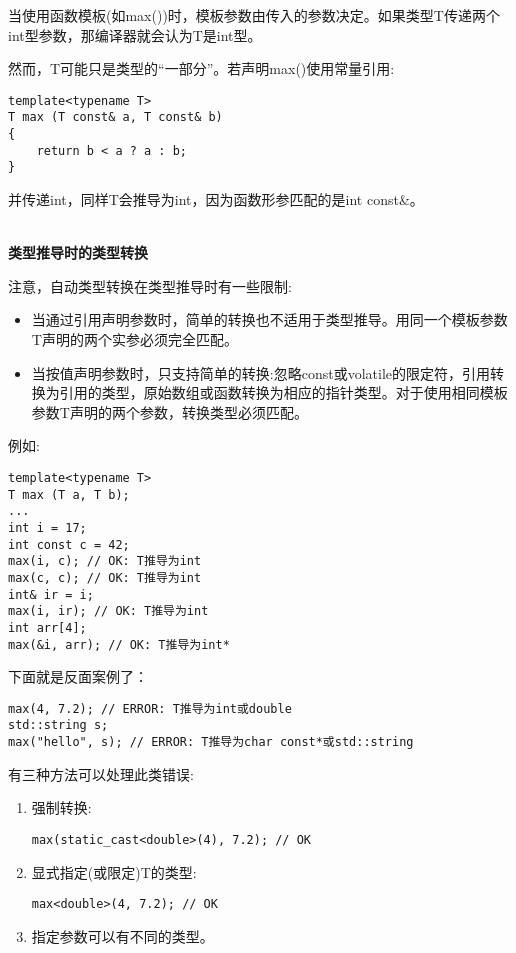 当使用函数模板(如max())时，模板参数由传入的参数决定。如果类型T传递两个int型参数，那编译器就会认为T是int型。

然而，T可能只是类型的“一部分”。若声明max()使用常量引用:

\begin{lstlisting}[style=styleCXX]
template<typename T>
T max (T const& a, T const& b)
{
	return b < a ? a : b;
}
\end{lstlisting}

并传递int，同样T会推导为int，因为函数形参匹配的是int const\&。

\hspace*{\fill} \\ %
\noindent
\textbf{类型推导时的类型转换}

注意，自动类型转换在类型推导时有一些限制:

\begin{itemize}
\item
当通过引用声明参数时，简单的转换也不适用于类型推导。用同一个模板参数T声明的两个实参必须完全匹配。

\item
当按值声明参数时，只支持简单的转换:忽略const或volatile的限定符，引用转换为引用的类型，原始数组或函数转换为相应的指针类型。对于使用相同模板参数T声明的两个参数，转换类型必须匹配。
\end{itemize}

例如:

\begin{lstlisting}[style=styleCXX]
template<typename T>
T max (T a, T b);
...
int i = 17;
int const c = 42;
max(i, c); // OK: T推导为int
max(c, c); // OK: T推导为int
int& ir = i;
max(i, ir); // OK: T推导为int
int arr[4];
max(&i, arr); // OK: T推导为int*
\end{lstlisting}

下面就是反面案例了：

\begin{lstlisting}[style=styleCXX]
max(4, 7.2); // ERROR: T推导为int或double
std::string s;
max("hello", s); // ERROR: T推导为char const*或std::string
\end{lstlisting}

有三种方法可以处理此类错误:

\begin{enumerate}
\item
强制转换:
\begin{lstlisting}[style=styleCXX]
max(static_cast<double>(4), 7.2); // OK
\end{lstlisting}

\item
显式指定(或限定)T的类型:
\begin{lstlisting}[style=styleCXX]
max<double>(4, 7.2); // OK
\end{lstlisting}

\item
指定参数可以有不同的类型。
\end{enumerate}

